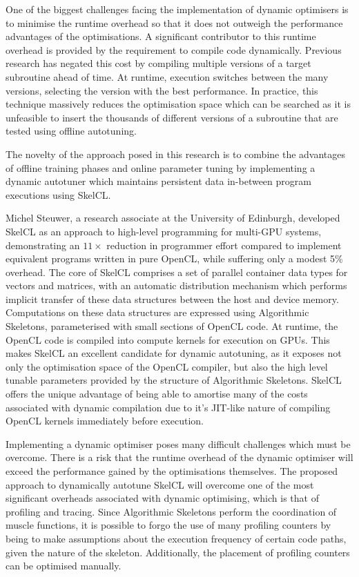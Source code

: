 One of the biggest challenges facing the implementation of dynamic
optimisers is to minimise the runtime overhead so that it does not
outweigh the performance advantages of the optimisations. A
significant contributor to this runtime overhead is provided by the
requirement to compile code dynamically. Previous research has negated
this cost by compiling multiple versions of a target subroutine ahead
of time. At runtime, execution switches between the many versions,
selecting the version with the best performance. In practice, this
technique massively reduces the optimisation space which can be
searched as it is unfeasible to insert the thousands of different
versions of a subroutine that are tested using offline autotuning.

The novelty of the approach posed in this research is to combine the
advantages of offline training phases and online parameter tuning by
implementing a dynamic autotuner which maintains persistent data
in-between program executions using SkelCL.

Michel Steuwer, a research associate at the University of Edinburgh,
developed SkelCL as an approach to high-level programming for
multi-GPU systems, demonstrating an $11\times$ reduction in programmer
effort compared to implement equivalent programs written in pure
OpenCL, while suffering only a modest 5\% overhead. The core of SkelCL
comprises a set of parallel container data types for vectors and
matrices, with an automatic distribution mechanism which performs
implicit transfer of these data structures between the host and device
memory. Computations on these data structures are expressed using
Algorithmic Skeletons, parameterised with small sections of OpenCL
code. At runtime, the OpenCL code is compiled into compute kernels for
execution on GPUs. This makes SkelCL an excellent candidate for
dynamic autotuning, as it exposes not only the optimisation space of
the OpenCL compiler, but also the high level tunable parameters
provided by the structure of Algorithmic Skeletons. SkelCL offers the
unique advantage of being able to amortise many of the costs
associated with dynamic compilation due to it's JIT-like nature of
compiling OpenCL kernels immediately before execution.

Implementing a dynamic optimiser poses many difficult challenges which
must be overcome. There is a risk that the runtime overhead of the
dynamic optimiser will exceed the performance gained by the
optimisations themselves. The proposed approach to dynamically
autotune SkelCL will overcome one of the most significant overheads
associated with dynamic optimising, which is that of profiling and
tracing. Since Algorithmic Skeletons perform the coordination of
muscle functions, it is possible to forgo the use of many profiling
counters by being to make assumptions about the execution frequency of
certain code paths, given the nature of the skeleton. Additionally,
the placement of profiling counters can be optimised manually.

